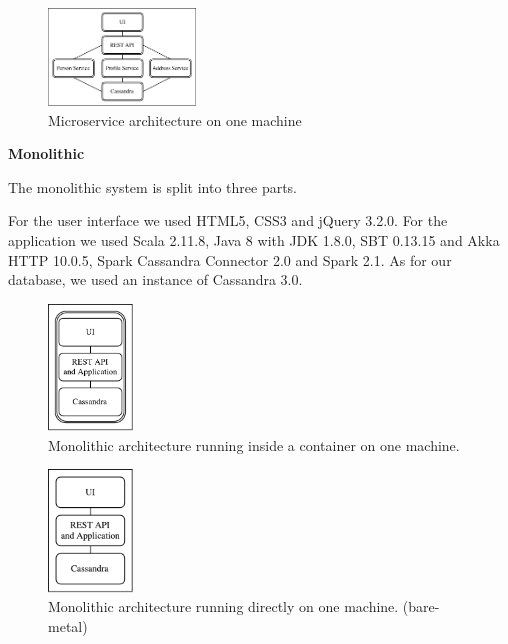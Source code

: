 \documentclass[a4paper,oneside]{bth}
\begin{document}
\begin{figure}[H]
\begin{center}

\includegraphics[width=0.35\textwidth]{A1/A1}
\caption{Microservice architecture on one machine}
\label{fig:A1}

\end{center}
\end{figure}


\clearpage
\par\vspace {0.5cm}

\textbf{Monolithic}

The monolithic system is split into three parts.

\par\vspace {0.5cm}
For the user interface we used HTML5, CSS3 and jQuery 3.2.0. For the application we used Scala 2.11.8, Java 8 with JDK 1.8.0, SBT 0.13.15 and Akka HTTP 10.0.5, Spark Cassandra Connector 2.0 and Spark 2.1. As for our database, we used an instance of Cassandra 3.0.

\begin{figure}[h]
\begin{center}

\includegraphics[width=0.2\textwidth]{A3/A3}
\caption{Monolithic architecture running inside a container on one machine.}
\label{fig:A3}

\end{center}
\end{figure}

\begin{figure}[h]
\begin{center}

\includegraphics[width=0.2\textwidth]{A4/A4}
\caption{Monolithic architecture running directly on one machine. (bare-metal)}
\label{fig:A4}

\end{center}
\end{figure}
\end{document}
